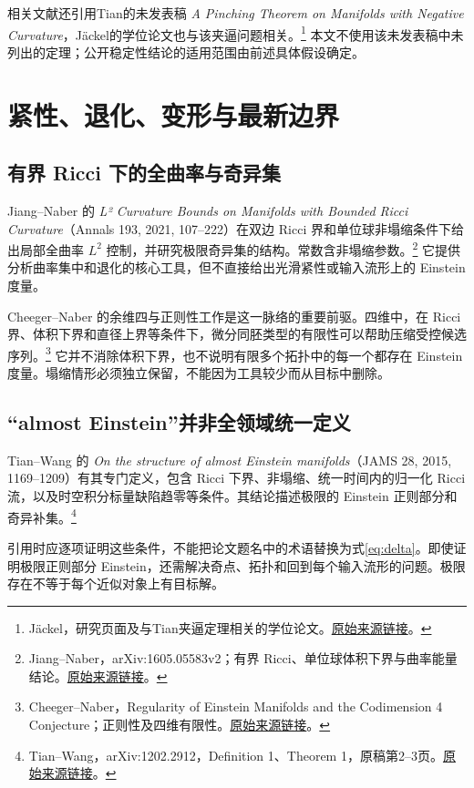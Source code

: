 \documentclass[11pt,a4paper]{article}
\theoremstyle{definition}
\newcommand{\src}[3]{\footnote{\raggedright #1，#2。\href{#3}{原始来源链接}。}}
\begin{document}
相关文献还引用Tian的未发表稿 \emph{A Pinching Theorem on Manifolds with Negative Curvature}，Jäckel的学位论文也与该夹逼问题相关。\src{Jäckel}{研究页面及与Tian夹逼定理相关的学位论文}{https://www.friederjaeckel.com/research}
本文不使用该未发表稿中未列出的定理；公开稳定性结论的适用范围由前述具体假设确定。

\section{紧性、退化、变形与最新边界}\label{sec:frontier}

\subsection{有界 Ricci 下的全曲率与奇异集}

Jiang--Naber 的 \emph{L² Curvature Bounds on Manifolds with Bounded Ricci Curvature}（Annals 193, 2021, 107--222）在双边 Ricci 界和单位球非塌缩条件下给出局部全曲率 $L^2$ 控制，并研究极限奇异集的结构。常数含非塌缩参数。\src{Jiang--Naber}{arXiv:1605.05583v2；有界 Ricci、单位球体积下界与曲率能量结论}{https://arxiv.org/abs/1605.05583v2}
它提供分析曲率集中和退化的核心工具，但不直接给出光滑紧性或输入流形上的 Einstein 度量。

Cheeger--Naber 的余维四与正则性工作是这一脉络的重要前驱。四维中，在 Ricci 界、体积下界和直径上界等条件下，微分同胚类型的有限性可以帮助压缩受控候选序列。\src{Cheeger--Naber}{Regularity of Einstein Manifolds and the Codimension 4 Conjecture；正则性及四维有限性}{https://arxiv.org/abs/1406.6534}
它并不消除体积下界，也不说明有限多个拓扑中的每一个都存在 Einstein 度量。塌缩情形必须独立保留，不能因为工具较少而从目标中删除。

\subsection{“almost Einstein”并非全领域统一定义}

Tian--Wang 的 \emph{On the structure of almost Einstein manifolds}（JAMS 28, 2015, 1169--1209）有其专门定义，包含 Ricci 下界、非塌缩、统一时间内的归一化 Ricci 流，以及时空积分标量缺陷趋零等条件。其结论描述极限的 Einstein 正则部分和奇异补集。\src{Tian--Wang}{arXiv:1202.2912，Definition 1、Theorem 1，原稿第2--3页}{https://arxiv.org/abs/1202.2912}

引用时应逐项证明这些条件，不能把论文题名中的术语替换为式\eqref{eq:delta}。即使证明极限正则部分 Einstein，还需解决奇点、拓扑和回到每个输入流形的问题。极限存在不等于每个近似对象上有目标解。
\end{document}
